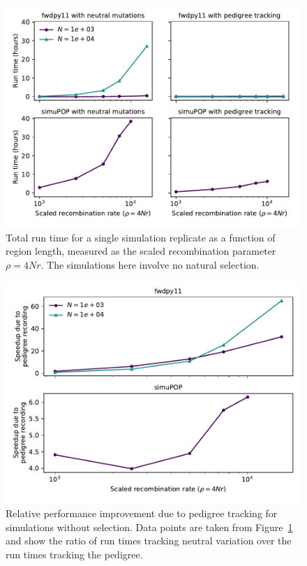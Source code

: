 \documentclass{article}
\begin{document}
\begin{figure}[!h]
    \includegraphics[]{sims/rawspeed_nosel}
    \caption{\label{sfig:rawspeed_nosel}Total run time for a single simulation replicate as a function of region
        length, measured as the scaled recombination parameter $\rho = 4Nr$.  The simulations here involve no natural
    selection.}
\end{figure}

\begin{figure}
    \includegraphics[]{sims/speedup_nosel}
    \caption{\label{sfig:speedup_nosel}Relative performance improvement due to pedigree tracking for simulations without
    selection.  Data points are taken from Figure~\ref{sfig:rawspeed_nosel} and show the ratio of run times tracking
neutral variation over the run times tracking the pedigree.}
\end{figure}
\end{document}
